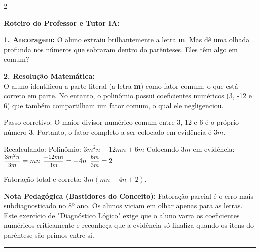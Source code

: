 \begin{multicols*}{2}
\ifgabarito
    \begin{tcolorbox}[colback=CorTitUm!5, colframe=CorTitUm, boxrule=1pt, arc=4pt, left=6pt, right=6pt, top=6pt, bottom=6pt]
    \small\textbf{\textcolor{CorTitUm}{Roteiro do Professor e Tutor IA:}}\par\vspace{0.1cm}
    \color{CinzaEscuro}
    \textbf{1. Ancoragem:} O aluno extraiu brilhantemente a letra \textbf{m}. Mas dê uma olhada profunda nos números que sobraram dentro do parênteses. Eles têm algo em comum?\par\vspace{0.1cm}
    \textbf{2. Resolução Matemática:}\\
    O aluno identificou a parte literal (a letra \textbf{m}) como fator comum, o que está correto em parte. No entanto, o polinômio possui coeficientes numéricos (3, -12 e 6) que também compartilham um fator comum, o qual ele negligenciou.
    
    Passo corretivo: 
    O maior divisor numérico comum entre 3, 12 e 6 é o próprio número \textbf{3}. 
    Portanto, o fator completo a ser colocado em evidência é $ 3m $.
    
    Recalculando:
    Polinômio: $ 3m^2n - 12mn + 6m $
    Colocando $ 3m $ em evidência:
    $ \mfrac{3m^2n}{3m} = mn $
    $ \mfrac{-12mn}{3m} = -4n $
    $ \mfrac{6m}{3m} = 2 $
    
    Fatoração total e correta:
    $ 3m(mn - 4n + 2) $.
    \end{tcolorbox}
    \vspace{0.15cm}
    
    \begin{boxexplicacao}
    \textbf{Nota Pedagógica (Bastidores do Conceito):} Fatoração parcial é o erro mais subdiagnosticado no 8º ano. Os alunos viciam em olhar apenas para as letras. Este exercício de "Diagnóstico Lógico" exige que o aluno varra os coeficientes numéricos criticamente e reconheça que a evidência só finaliza quando os itens do parêntese são primos entre si.
    \end{boxexplicacao}
\fi

\par\vspace{\espacoQuestao}

\noindent\textcolor{CorLinha}{\rule{\linewidth}{0.5pt}} 
\par\vspace{\espacoPreQuestao}

\end{multicols*}
